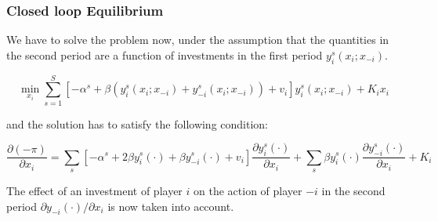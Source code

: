 					\begin{frame}
					
\frametitle{Closed loop Equilibrium}

We have to solve the problem now, under the assumption that the quantities in the second period are a function of investments in the first period $y_i^s(x_i;x_{-i})$.

\begin{equation}
	\min_{x_i} \sum_{s=1}^S \left[ - \alpha^s + \beta( y_i^s(x_i;x_{-i})+ y_{-i}^s(x_i;x_{-i})) + v_i \right] y_i^s(x_i;x_{-i}) + K_i x_i
\end{equation}

and the solution has to satisfy the following condition:

\begin{equation}
	\frac{\partial (- \pi)}{\partial x_i} = \sum_s \left[-\alpha^s + 2 \beta y_i^s (\cdot) + \beta y_{-i}^s(\cdot) + v_i \right] \frac{\partial y_i^s (\cdot)}{\partial x_i} + \sum_s \beta y_i^s (\cdot) \frac{\partial y_{-i}^s (\cdot)}{\partial x_i} + K_i
\end{equation}

The effect of an investment of player $i$ on the action of player $-i$ in the second period $\partial y_{-i} (\cdot)/\partial x_i$ is now taken into account.


							\end{frame}